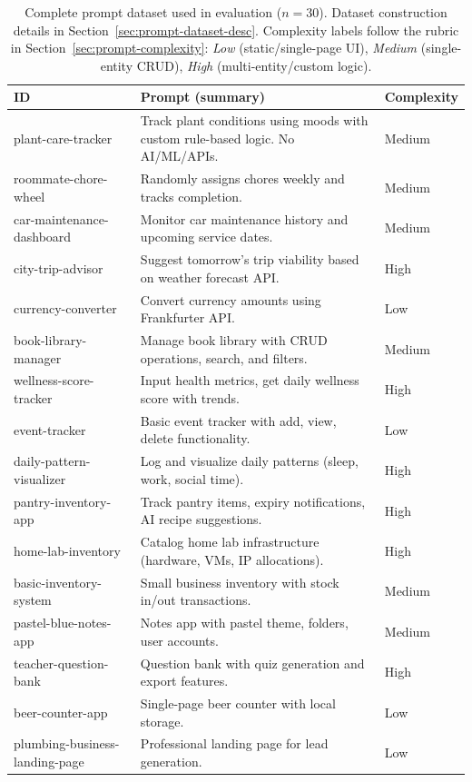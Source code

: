 \documentclass{article}
\begin{document}
\begin{table}[h]
\caption{Complete prompt dataset used in evaluation ($n=30$). Dataset construction details in Section~\ref{sec:prompt-dataset-desc}. Complexity labels follow the rubric in Section~\ref{sec:prompt-complexity}: \emph{Low} (static/single-page UI), \emph{Medium} (single-entity CRUD), \emph{High} (multi-entity/custom logic).}
\label{tab:prompt-dataset}
\centering
\scriptsize
\begin{tabular}{p{3cm}p{8cm}p{1.5cm}}
\toprule
ID & Prompt (summary) & Complexity \\
\midrule
plant-care-tracker & Track plant conditions using moods with custom rule-based logic. No AI/ML/APIs. & Medium \\
roommate-chore-wheel & Randomly assigns chores weekly and tracks completion. & Medium \\
car-maintenance-dashboard & Monitor car maintenance history and upcoming service dates. & Medium \\
city-trip-advisor & Suggest tomorrow's trip viability based on weather forecast API. & High \\
currency-converter & Convert currency amounts using Frankfurter API. & Low \\
book-library-manager & Manage book library with CRUD operations, search, and filters. & Medium \\
wellness-score-tracker & Input health metrics, get daily wellness score with trends. & High \\
event-tracker & Basic event tracker with add, view, delete functionality. & Low \\
daily-pattern-visualizer & Log and visualize daily patterns (sleep, work, social time). & High \\
pantry-inventory-app & Track pantry items, expiry notifications, AI recipe suggestions. & High \\
home-lab-inventory & Catalog home lab infrastructure (hardware, VMs, IP allocations). & High \\
basic-inventory-system & Small business inventory with stock in/out transactions. & Medium \\
pastel-blue-notes-app & Notes app with pastel theme, folders, user accounts. & Medium \\
teacher-question-bank & Question bank with quiz generation and export features. & High \\
beer-counter-app & Single-page beer counter with local storage. & Low \\
plumbing-business-landing-page & Professional landing page for lead generation. & Low \\

\end{tabular}
\end{table}
\end{document}
